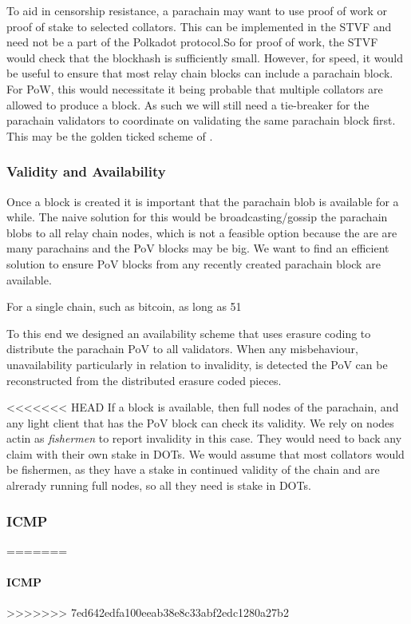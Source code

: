 To aid in censorship resistance, a parachain may want to use proof of work or proof of stake to selected collators. This can be implemented in the STVF and need not be a part of the Polkadot protocol.So for proof of work, the STVF would check that the blockhash is sufficiently small. However, for speed, it would be useful to ensure that most relay chain blocks can include a parachain block. For PoW, this would necessitate it being probable that multiple collators are allowed to produce a block. As such we will still need a tie-breaker for the parachain validators to coordinate on validating the same parachain block first. This may be the golden ticked scheme of \cite{spottypaper}.


\subsubsection{Validity and Availability} \label{sec:validity-and-availability}
Once a block is created it is important that the parachain blob is available for a while.
The naive solution for this would be broadcasting/gossip the parachain blobs to all relay chain nodes, which is not a feasible option because the are are many parachains and the PoV blocks may be big.
We want to find an efficient solution to ensure PoV blocks from any recently created parachain block are available.
 
For a single chain, such as bitcoin, as long as 51%

To this end we designed an availability scheme that uses erasure coding \cite{} to distribute the parachain PoV to all validators.
When any misbehaviour, unavailability particularly in relation to invalidity, is detected the PoV can be reconstructed from the distributed erasure coded pieces.

<<<<<<< HEAD
If a block is available, then full nodes of the parachain, and any light client that has the PoV block can check its validity. We rely on nodes actin as {\em fishermen} to report invalidity in this case. They would need to back any claim with their own stake in DOTs. We would assume that most collators would be fishermen, as they have a stake in continued validity of the chain and are alrerady running full nodes, so all they need is stake in DOTs.

\subsubsection{ICMP} \label{sec:ICMP}
=======
\paragraph{ICMP}
>>>>>>> 7ed642edfa100eeab38e8c33abf2edc1280a27b2
